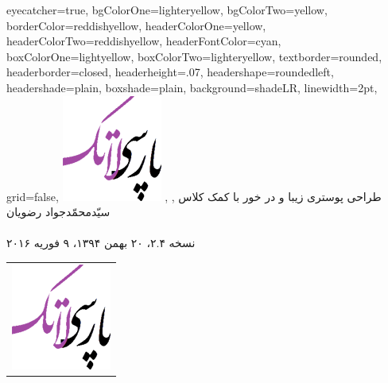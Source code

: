 \documentclass[debug,a0paper]{xebaposter}
\begin{document}

      \begin{poster}%
      {
      eyecatcher=true,
      bgColorOne=lighteryellow,%
      bgColorTwo=yellow,
      borderColor=reddishyellow,
      headerColorOne=yellow,
      headerColorTwo=reddishyellow,
      headerFontColor=cyan,
      boxColorOne=lightyellow,      
      boxColorTwo=lighteryellow,
      textborder=rounded,
      headerborder=closed,
      headerheight=.07\textheight,
      headershape=roundedleft,
      headershade=plain,
      boxshade=plain,
      background=shadeLR,
      linewidth=2pt,
      grid=false, %
      }
 {
      \includegraphics[height=0.05\textheight]{logo}
 }
 {طراحی پوستری زیبا و در خور با کمک کلاس 
}
 {\large {}, , سیّدمحمّدجواد رضویان
 \\%
 {\normalsize\texttt{}
 \\
نسخه ۲.۴، ۲۰ بهمن ۱۳۹۴، ۹ فوریه ۲۰۱۶
 }}
 {
\begin{tabular}{r}
    \includegraphics[height=0.05 \textheight]{logo}\\
\end{tabular}
 }


\end{poster}
\end{document}
